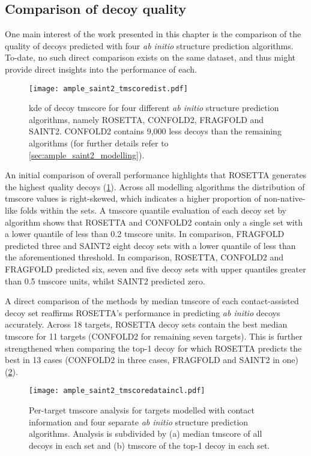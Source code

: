 \subsection{Comparison of decoy quality}
One main interest of the work presented in this chapter is the comparison of the quality of decoys predicted with four \textit{ab initio} structure prediction algorithms. To-date, no such direct comparison exists on the same dataset, and thus might provide direct insights into the performance of each.

\begin{figure}[H]
    \centering
    \texttt{[image: ample\_saint2\_tmscoredist.pdf]}
    \caption[Distribution of decoy TM-scores for four modelling algorithms]{\gls{kde} of decoy \gls{tmscore} for four different \textit{ab initio} structure prediction algorithms, namely ROSETTA, CONFOLD2, FRAGFOLD and SAINT2. CONFOLD2 contains 9,000 less decoys than the remaining algorithms (for further details refer to \cref{sec:ample_saint2_modelling}).}
    \label{fig:ample_saint2_tmscoredist}
\end{figure}

An initial comparison of overall performance highlights that ROSETTA generates the highest quality decoys (\cref{fig:ample_saint2_tmscoredist}). Across all modelling algorithms the distribution of \gls{tmscore} values is right-skewed, which indicates a higher proportion of non-native-like folds within the sets. A \gls{tmscore} quantile evaluation of each decoy set by algorithm shows that ROSETTA and CONFOLD2 contain only a single set with a lower quantile of less than 0.2 \gls{tmscore} units. In comparison, FRAGFOLD predicted three and SAINT2 eight decoy sets with a lower quantile of less than the aforementioned threshold. In comparison, ROSETTA, CONFOLD2 and FRAGFOLD predicted six, seven and five decoy sets with upper quantiles greater than 0.5 \gls{tmscore} units, whilst SAINT2 predicted zero.

A direct comparison of the methods by median \gls{tmscore} of each contact-assisted decoy set reaffirms ROSETTA's performance in predicting \textit{ab initio} decoys accurately. Across 18 targets, ROSETTA decoy sets contain the best median \gls{tmscore} for 11 targets (CONFOLD2 for remaining seven targets). This is further strengthened when comparing the top-1 decoy for which ROSETTA predicts the best in 13 cases (CONFOLD2 in three cases, FRAGFOLD and SAINT2 in one) (\cref{fig:ample_saint2_tmscoredataincl}).

\begin{figure}[H]
    \centering
    \texttt{[image: ample\_saint2\_tmscoredataincl.pdf]}
    \caption[Per-target TM-score analysis for four modelling algorithms with contacts]{Per-target \gls{tmscore} analysis for targets modelled with contact information and four separate \textit{ab initio} structure prediction algorithms. Analysis is subdivided by (a) median \gls{tmscore} of all decoys in each set and (b) \gls{tmscore} of the top-1 decoy in each set.}
    \label{fig:ample_saint2_tmscoredataincl}
\end{figure}

